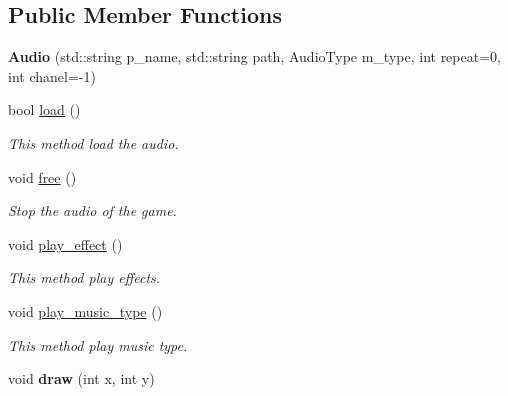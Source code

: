 \subsection*{Public Member Functions}
\begin{DoxyCompactItemize}
\item 
{\bfseries Audio} (std\+::string p\+\_\+name, std\+::string path, Audio\+Type m\+\_\+type, int repeat=0, int chanel=-\/1)\hypertarget{classengine_1_1_audio_a1b723136c787deae501ca667e3d367a1}{}\label{classengine_1_1_audio_a1b723136c787deae501ca667e3d367a1}

\item 
bool \hyperlink{classengine_1_1_audio_a98b4a31bcd84f4a6868b414f347bc72e}{load} ()
\begin{DoxyCompactList}\small\item\em This method load the audio. \end{DoxyCompactList}\item 
void \hyperlink{classengine_1_1_audio_afa4c5b2b7c325cafb74707ce026ddb3c}{free} ()
\begin{DoxyCompactList}\small\item\em Stop the audio of the game. \end{DoxyCompactList}\item 
void \hyperlink{classengine_1_1_audio_a337e36c3f7695aeb241bd2e6b46480b2}{play\+\_\+effect} ()
\begin{DoxyCompactList}\small\item\em This method play effects. \end{DoxyCompactList}\item 
void \hyperlink{classengine_1_1_audio_ad25f1248a483fc53bfa4d963b859355c}{play\+\_\+music\+\_\+type} ()
\begin{DoxyCompactList}\small\item\em This method play music type. \end{DoxyCompactList}\item 
void {\bfseries draw} (int x, int y)\hypertarget{classengine_1_1_audio_a0c8d23551a3a27ce6a666cb2560d7a75}{}\label{classengine_1_1_audio_a0c8d23551a3a27ce6a666cb2560d7a75}


\end{DoxyCompactItemize}
